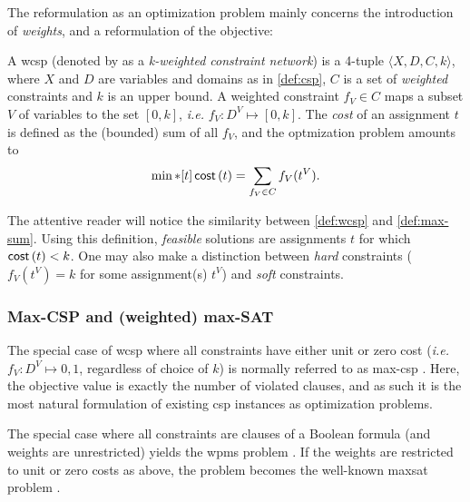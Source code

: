 The reformulation as an optimization problem mainly concerns the introduction of \emph{weights}, and a reformulation of the objective:
\begin{definition} \label{def:wcsp}
	A \gls{wcsp} (denoted by \textcite[\pno~284]{Meseguer06} as a \emph{k-weighted constraint network}) is a 4-tuple \(\langle X, D, C, k\rangle\), where \(X\) and \(D\) are variables and domains as in \cref{def:csp}, \(C\) is a set of \emph{weighted} constraints and \(k\) is an upper bound.
	A weighted constraint \(f_V\in C\) maps a subset \(V\) of variables to the set \([0,k]\), \emph{i.e.} \(f_V : D^V \mapsto [0,k]\).
	The \emph{cost} of an assignment \(t\) is defined as the (bounded) sum of all \(f_V\), and the optmization problem amounts to
	\begin{equation*}
		\min*[t] \operatorname{\mathsf{cost}}\left(t\right) = \sum_{f_V\in C} f_V(t^V).
	\end{equation*}
\end{definition}

The attentive reader will notice the similarity between \cref{def:wcsp} and \cref{def:max-sum}. 
Using this definition, \emph{feasible} solutions are assignments \(t\) for which \(\operatorname{\mathsf{cost}}\left(t\right) < k\).
One may also make a distinction between \emph{hard} constraints (\(f_V(t^V) = k\) for some assignment(s) \(t^V\)) and \emph{soft} constraints.


\subsubsection{Max-CSP and (weighted) max-SAT}
The special case of \gls{wcsp} where all constraints have either unit or zero cost (\emph{i.e.} \(f_V : D^V \mapsto {0,1}\), regardless of choice of \(k\)) is normally referred to as max-\gls{csp} \parencite[\pno~284]{Meseguer06}.
Here, the objective value is exactly the number of violated clauses, and as such it is the most natural formulation of existing \gls{csp} instances as optimization problems.

The special case where all constraints are clauses of a Boolean formula (and weights are unrestricted) yields the \gls{wpms} problem \textcite[\pno~2]{deGivry14}.
If the weights are restricted to unit or zero costs as above, the problem becomes the well-known \gls{maxsat} problem \parencite[\pno~284]{Meseguer06}.

